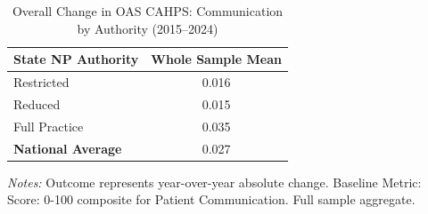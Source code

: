 \begin{table}[htbp]
    \centering
    \caption{Overall Change in OAS CAHPS: Communication by Authority (2015--2024)}
    \label{tab:d_oas_grp1_full}
    \vspace{0.2cm}
    \begin{tabular}{lc}
        \toprule
        \textbf{State NP Authority} & \textbf{Whole Sample Mean} \\
        \midrule
        Restricted & 0.016 \\
        Reduced & 0.015 \\
        Full Practice & 0.035 \\
        \midrule
        \textbf{National Average} & 0.027 \\
        \bottomrule
    \end{tabular}
    \vspace{0.1cm}
    \begin{minipage}{0.6\textwidth}
        \footnotesize \textit{Notes:} Outcome represents year-over-year absolute change. Baseline Metric: Score: 0-100 composite for Patient Communication. Full sample aggregate.
    \end{minipage}
\end{table}